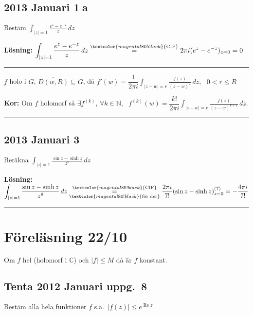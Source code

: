 \subsection{2013 Januari \textcircled{1a}}
Bestäm $\displaystyle\int_{|z| = 1} \frac{e^z - e^{-z}}{z}\,dz$

\textbf{Lösning:} $\displaystyle\int_{|z| = 1} \frac{e^z - e^{-z}}{z}\,dz \overset{\textcolor{magenta!80!black}{\text{CIF}}}{=} 2\pi i(e^z - e^{-z})_{z = 0} = 0$

\noindent\rule{\linewidth}{0.4pt}

\begin{theorem}
$f$ holo i $G$, $\overline{D(w, R)} \subseteq G$, då $f'(w) = \dfrac{1}{2\pi i} \displaystyle\int_{|z - w| = r} \frac{f(z)}{(z - w)^2}\,dz$, \ $0 < r \le R$

\textbf{Kor:} Om $f$ holomorf så $\exists f^{(k)}$, $\forall k \in \mathbb{N}$, \ $f^{(k)}(w) = \dfrac{k!}{2\pi i} \displaystyle\int_{|z - w| = r} \frac{f(z)}{(z - w)^{k+1}}\,dz$.
\end{theorem}

\noindent\rule{\linewidth}{0.4pt}

\subsection{2013 Januari \textcircled{3}}
Beräkna $\displaystyle\int_{|z| = 1} \frac{\sin z - \sinh z}{z^8}\,dz$

\textbf{Lösning:} $\displaystyle\int_{|z| = 1} \frac{\sin z - \sinh z}{z^8}\,dz \underset{\textcolor{magenta!80!black}{\text{för der}}}{\overset{\textcolor{magenta!80!black}{\text{CIF}}}{=}} \frac{2\pi i}{7!}(\sin z - \sinh z)^{(7)}_{z = 0} = -\frac{4\pi i}{7!}$

\noindent\rule{\linewidth}{0.4pt}

\section{Föreläsning 22/10}
\begin{theorem}
Om $f$ hel (holomorf i $\mathbb{C}$) och $|f| \le M$ då är $f$ konstant.
\end{theorem}

\subsection{Tenta 2012 Januari uppg.\ 8}
Bestäm alla hela funktioner $f$ s.a.\ $|f(z)| \le e^{\operatorname{Re} z}$

